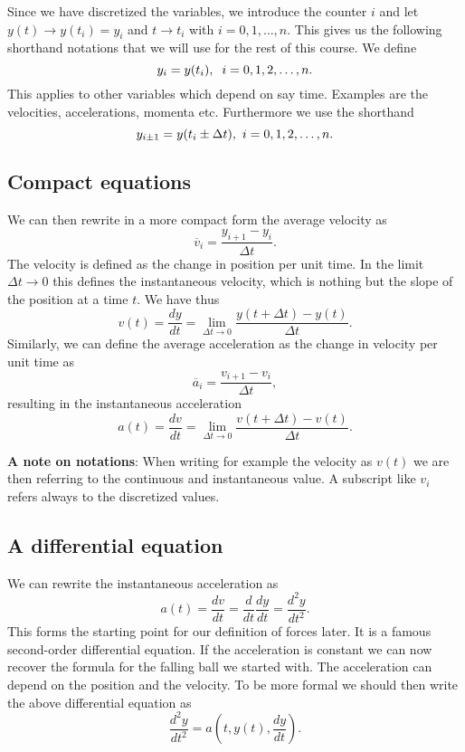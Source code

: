 \documentclass[%
oneside,                 %
final,                   %
10pt]{article}
\begin{document}
Since we have discretized the variables, we introduce the counter $i$ and let $y(t)\rightarrow y(t_i)=y_i$ and $t\rightarrow t_i$
with $i=0,1,\dots, n$. This gives us the following shorthand notations that we will use for the rest of this course. We define
\[
y_i = y(t_i),\hspace{0.2cm} i=0,1,2,\dots,n.
\]
This applies to other variables which depend on say time. Examples are the velocities, accelerations, momenta etc.
Furthermore we use the shorthand
\[
y_{i\pm 1} = y(t_i\pm \Delta t),\hspace{0.12cm} i=0,1,2,\dots,n.
\]

\subsection{Compact equations}
We can then rewrite in a more compact form the average velocity as
\[
\overline{v}_i = \frac{y_{i+1}-y_{i}}{\Delta t}.
\]
The velocity is defined as the change in position per unit time.
In the limit $\Delta t \rightarrow 0$ this defines the instantaneous velocity, which is nothing but the slope of the position at a time $t$.
We have thus
\[
v(t) = \frac{dy}{dt}=\lim_{\Delta t \rightarrow 0}\frac{y(t+\Delta t)-y(t)}{\Delta t}.
\]
Similarly, we can define the average acceleration as the change in velocity per unit time as
\[
\overline{a}_i = \frac{v_{i+1}-v_{i}}{\Delta t},
\]
resulting in the instantaneous acceleration
\[
a(t) = \frac{dv}{dt}=\lim_{\Delta t\rightarrow 0}\frac{v(t+\Delta t)-v(t)}{\Delta t}.
\]

\textbf{A note on notations}: When writing for example the velocity as $v(t)$ we are then referring to the continuous and instantaneous value. A subscript like
$v_i$ refers always to the discretized values.

\subsection{A differential equation}
We can rewrite the instantaneous acceleration as
\[
a(t) = \frac{dv}{dt}=\frac{d}{dt}\frac{dy}{dt}=\frac{d^2y}{dt^2}.
\]
This forms the starting point for our definition of forces later. It is a famous second-order differential equation. If the acceleration is constant we can now recover the formula for the falling ball we started with.
The acceleration can depend on the position and the velocity. To be more formal we should then write the above differential equation as
\[
\frac{d^2y}{dt^2}=a(t,y(t),\frac{dy}{dt}).
\]
\end{document}
